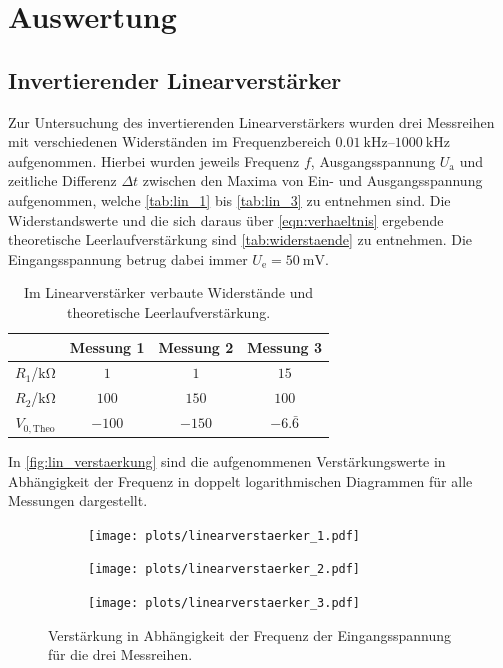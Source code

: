 \section{Auswertung}
\subsection{Invertierender Linearverstärker}
Zur Untersuchung des invertierenden Linearverstärkers wurden drei Messreihen mit verschiedenen Widerständen im Frequenzbereich $\SIrange{0.01}{1000}{\kilo\hertz}$ aufgenommen. Hierbei wurden jeweils Frequenz $f$, Ausgangsspannung $U_\mathrm{a}$ und zeitliche Differenz $\Delta t$ zwischen den Maxima von Ein- und Ausgangsspannung aufgenommen, welche \autoref{tab:lin_1} bis \ref{tab:lin_3} zu entnehmen sind. Die Widerstandswerte und die sich daraus über \autoref{eqn:verhaeltnis} ergebende theoretische Leerlaufverstärkung sind \autoref{tab:widerstaende} zu entnehmen. Die Eingangsspannung betrug dabei immer $U_\mathrm{e} = \SI{50}{\milli\volt}$.

\begin{table}[H]
  \centering
  \caption{Im Linearverstärker verbaute Widerstände und theoretische Leerlaufverstärkung.}
  \begin{tabular}{c c c c}
    \toprule
    & Messung 1 & Messung 2 & Messung 3\\
    \midrule
    $R_1$/$\si{\kilo\ohm}$ & $\num{1}$ & $\num{1}$ & $\num{15}$\\
    $R_2$/$\si{\kilo\ohm}$ & $\num{100}$ & $\num{150}$ & $\num{100}$\\
    $V_{0,\mathrm{Theo}}$ & $\num{-100}$ & $\num{-150}$ & $-6.\bar{6}$\\
    \bottomrule
  \end{tabular}
  \label{tab:widerstaende}
\end{table}

In \autoref{fig:lin_verstaerkung} sind die aufgenommenen Verstärkungswerte in Abhängigkeit der Frequenz in doppelt logarithmischen Diagrammen für alle Messungen dargestellt.

\begin{figure}[H]
  \centering
  \begin{subfigure}{.4\textwidth}
    \texttt{[image: plots/linearverstaerker\_1.pdf]}
  \end{subfigure}
  \begin{subfigure}{.4\textwidth}
    \texttt{[image: plots/linearverstaerker\_2.pdf]}
  \end{subfigure}
  \begin{subfigure}{.4\textwidth}
    \texttt{[image: plots/linearverstaerker\_3.pdf]}
  \end{subfigure}
  \caption{Verstärkung in Abhängigkeit der Frequenz der Eingangsspannung für die drei Messreihen.}
  \label{fig:lin_verstaerkung}
\end{figure}

